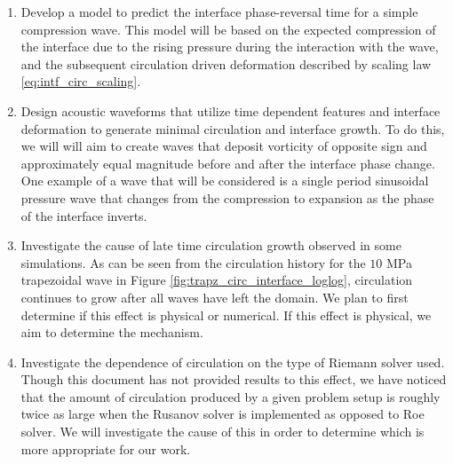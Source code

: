 \begin{itemize}
\begin{enumerate}
  \item Develop a model to predict the interface phase-reversal time
    for a simple compression wave. This model will be based on the
    expected compression of the interface due to the rising pressure
    during the interaction with the wave, and the subsequent
    circulation driven deformation described by scaling law
    \eqref{eq:intf_circ_scaling}.
  \item Design acoustic waveforms that utilize time dependent features
    and interface deformation to generate minimal circulation and
    interface growth. To do this, we will will aim to create waves
    that deposit vorticity of opposite sign and approximately equal
    magnitude before and after the interface phase change. One example
    of a wave that will be considered is a single period sinusoidal
    pressure wave that changes from the compression to expansion as
    the phase of the interface inverts.
  \item Investigate the cause of late time circulation growth observed
    in some simulations. As can be seen from the circulation history
    for the $10$ MPa trapezoidal wave in Figure
    \ref{fig:trapz_circ_interface_loglog}, circulation continues to
    grow after all waves have left the domain. We plan to first
    determine if this effect is physical or numerical. If this effect
    is physical, we aim to determine the mechanism.
  \item Investigate the dependence of circulation on the type of
    Riemann solver used. Though this document has not provided results
    to this effect, we have noticed that the amount of circulation
    produced by a given problem setup is roughly twice as large when
    the Rusanov solver is implemented as opposed to Roe solver. We
    will investigate the cause of this in order to determine which is
    more appropriate for our work.
  \end{enumerate}
\end{itemize}







